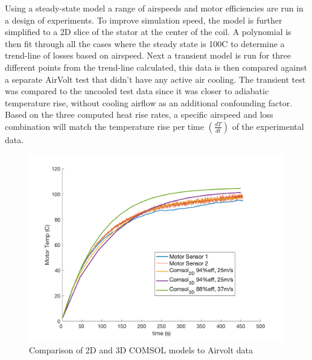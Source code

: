 \documentclass[]{aiaa-tc}%
\begin{document}
Using a steady-state model a range of airspeeds and motor efficiencies are run in a design of experiments. To improve simulation speed, the model is further simplified to a 2D slice of the stator at the center of the coil. A polynomial is then fit through all the cases where the steady state is 100\degree C to determine a trend-line of losses based on airspeed.
Next a transient model is run for three different points from the trend-line calculated, this data is then compared against a separate AirVolt test that didn't have any active air cooling. The transient test was compared to the uncooled test data since it was closer to adiabatic temperature rise, without cooling airflow as an additional confounding factor. Based on the three computed heat rise rates, a specific airspeed and loss combination will match the temperature rise per time $(\frac{dT}{dt})$ of the experimental data.

\begin{figure}[!h]%
	\centering
	\includegraphics[width=1.0\textwidth]{figures/COMSOLvsTest.png}
	\caption{Comparison of 2D and 3D COMSOL models to Airvolt data}
	\label{fig:COMSOLresults}
\end{figure}
\end{document}
